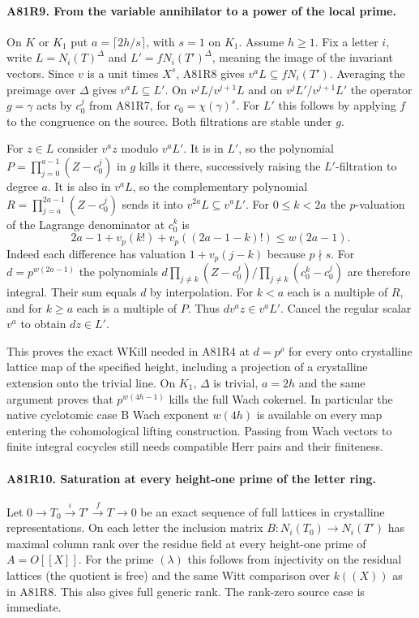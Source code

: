 \paragraph{A81R9. From the variable annihilator to a power of the local prime.}
On $K$ or $K_1$ put $a=\lceil2h/s\rceil$, with $s=1$ on
$K_1$. Assume $h\ge1$. Fix a letter $i$, write $L=N_i(T)^\Delta$
and $L'=fN_i(T')^\Delta$, meaning the image of the invariant
vectors. Since $v$ is a unit times $X^s$, A81R8 gives
$v^a L\subseteq fN_i(T')$. Averaging the preimage over
$\Delta$ gives $v^aL\subseteq L'$. On
$v^jL/v^{j+1}L$ and on $v^jL'/v^{j+1}L'$ the operator
$g=\gamma$ acts by $c_0^j$ from A81R7, for $c_0=\chi(\gamma)^s$.
For $L'$ this follows by applying $f$ to the congruence on the
source. Both filtrations are stable under $g$.

For $z\in L$ consider $v^az$ modulo $v^a L'$. It is in $L'$,
so the polynomial $P=\prod_{j=0}^{a-1}(Z-c_0^j)$ in $g$ kills it
there, successively raising the $L'$-filtration to degree $a$.
It is also in $v^a L$, so the complementary polynomial
$R=\prod_{j=a}^{2a-1}(Z-c_0^j)$ sends it into
$v^{2a}L\subseteq v^aL'$. For $0\le k<2a$ the $p$-valuation
of the Lagrange denominator at $c_0^k$ is
\[
 2a-1+v_p(k!)+v_p((2a-1-k)!)\le w(2a-1).
\]
Indeed each difference has valuation $1+v_p(j-k)$ because
$p\nmid s$. For $d=p^{w(2a-1)}$ the polynomials
$d\prod_{j\ne k}(Z-c_0^j)/\prod_{j\ne k}(c_0^k-c_0^j)$
are therefore integral. Their sum equals $d$ by interpolation.
For $k<a$ each is a multiple of $R$, and for $k\ge a$ each
is a multiple of $P$. Thus $dv^az\in v^a L'$.
Cancel the regular scalar $v^a$ to obtain $dz\in L'$.

This proves the exact $\mathrm{WKill}$ needed in A81R4 at
$d=p^\rho$ for every onto crystalline lattice map of the
specified height, including a projection of a crystalline
extension onto the trivial line. On $K_1$, $\Delta$ is trivial,
$a=2h$ and the same argument proves that $p^{w(4h-1)}$ kills
the full Wach cokernel. In particular the native cyclotomic
case B Wach exponent $w(4h)$ is available on every map entering
the cohomological lifting construction. Passing from Wach
vectors to finite integral cocycles still needs compatible
Herr pairs and their finiteness.

\paragraph{A81R10. Saturation at every height-one prime of the letter ring.}
Let $0\to T_0\xrightarrow{\iota}T'\xrightarrow{f}T\to0$ be an
exact sequence of full lattices in crystalline representations.
On each letter the inclusion matrix $B:N_i(T_0)\to N_i(T')$
has maximal column rank over the residue field at every height-one
prime of $A=O[[X]]$. For the prime $(\lambda)$ this follows from
injectivity on the residual lattices (the quotient is free) and the
same Witt comparison over $k((X))$ as in A81R8. This also gives full
generic rank. The rank-zero source case is immediate.

